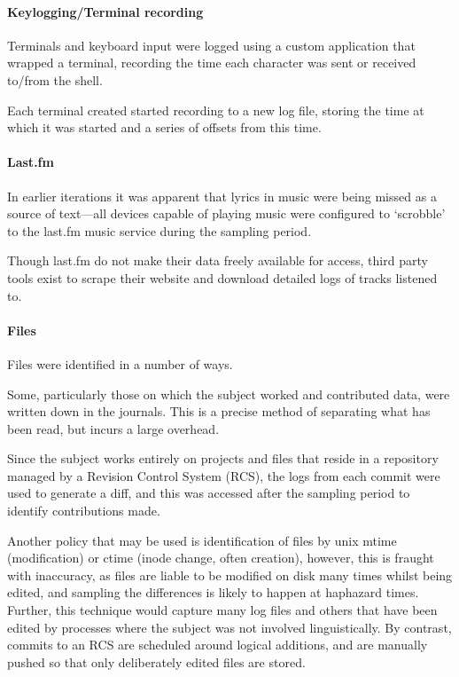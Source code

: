 \paragraph{Keylogging/Terminal recording}
Terminals and keyboard input were logged using a custom application that wrapped a terminal, recording the time each character was sent or received to/from the shell.

Each terminal created started recording to a new log file, storing the time at which it was started and a series of offsets from this time.

\paragraph{Last.fm}
In earlier iterations it was apparent that lyrics in music were being missed as a source of text---all devices capable of playing music were configured to `scrobble' to the last.fm music service during the sampling period.

Though last.fm do not make their data freely available for access, third party tools exist to scrape their website and download detailed logs of tracks listened to.

\paragraph{Files}
Files were identified in a number of ways.

Some, particularly those on which the subject worked and contributed data, were written down in the journals.  This is a precise method of separating what has been read, but incurs a large overhead.

Since the subject works entirely on projects and files that reside in a repository managed by a Revision Control System (RCS), the logs from each commit were used to generate a diff, and this was accessed after the sampling period to identify contributions made.

Another policy that may be used is identification of files by unix mtime (modification) or ctime (inode change, often creation), however, this is fraught with inaccuracy, as files are liable to be modified on disk many times whilst being edited, and sampling the differences is likely to happen at haphazard times.  Further, this technique would capture many log files and others that have been edited by processes where the subject was not involved linguistically.  By contrast, commits to an RCS are scheduled around logical additions, and are manually pushed so that only deliberately edited files are stored.

